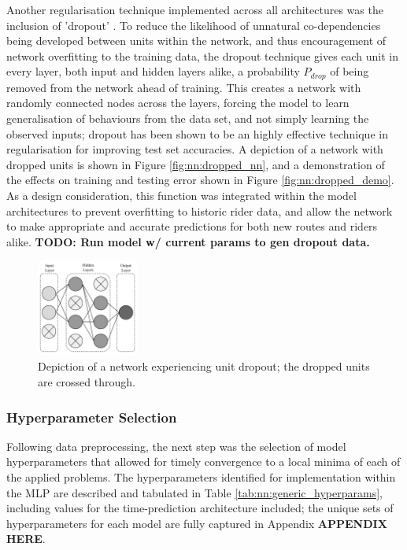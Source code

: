 \documentclass[a4paper, 10pt]{article}
\numberwithin{equation}{section}
\begin{document}
Another regularisation technique implemented across all architectures was the inclusion of 'dropout' \cite{nn:dropout}. To reduce the likelihood of unnatural co-dependencies being developed between units within the network, and thus encouragement of network overfitting to the training data, the dropout technique gives each unit in every layer, both input and hidden layers alike, a probability $P_{drop}$ of being removed from the network ahead of training. This creates a network with randomly connected nodes across the layers, forcing the model to learn generalisation of behaviours from the data set, and not simply learning the observed inputs; dropout has been shown to be an highly effective technique in regularisation for improving test set accuracies. A depiction of a network with dropped units is shown in Figure \ref{fig:nn:dropped_nn}, and a demonstration of the effects on training and testing error shown in Figure \ref{fig:nn:dropped_demo}. As a design consideration, this function was integrated within the model architectures to prevent overfitting to historic rider data, and allow the network to make appropriate and accurate predictions for both new routes and riders alike.  \textbf{TODO: Run model w/ current params to gen dropout data.} 

\begin{figure}[h!]
    \centering
    \includegraphics[width=0.3\textwidth]{images/NN_Generic/dropout.pdf}
    \caption{Depiction of a network experiencing unit dropout; the dropped units are crossed through.}
    \label{fig:my_label}
\end{figure}

\subsubsection{Hyperparameter Selection}

Following data preprocessing, the next step was the selection of model hyperparameters that allowed for timely convergence to a local minima of each of the applied problems. The hyperparameters identified for implementation within the MLP are described and tabulated in Table \ref{tab:nn:generic_hyperparams}, including values for the time-prediction architecture included; the unique sets of hyperparameters for each model are fully captured in Appendix \textbf{APPENDIX HERE}. \medbreak
\end{document}
